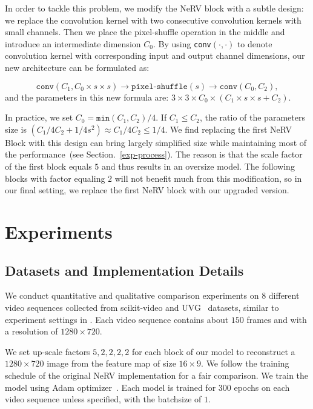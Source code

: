 \documentclass[runningheads]{llncs}
\begin{document}
In order to tackle this problem, we modify the NeRV block with a subtle design: we replace the convolution kernel with two consecutive convolution kernels with small channels. Then we place the pixel-shuffle operation in the middle and introduce an intermediate dimension $C_0$. By using \texttt{conv}$\left(\cdot,\cdot\right)$ to denote convolution kernel with corresponding input and output channel dimensions, our new architecture can be formulated as:

\begin{equation}
\texttt{conv}(C_1, C_0\times s\times s)\rightarrow\texttt{pixel-shuffle}(s)\rightarrow\texttt{conv}(C_0, C_2),
\end{equation}
and the parameters in this new formula are: $3\times 3\times C_0 \times(C_1 \times s\times s + C_2)$.

In practice, we set $C_0 = \texttt{min}(C_1, C_2) / 4$. If $C_1 \leq C_2$, the ratio of the parameters size is $(C_1 / 4C_2 + 1 / 4s^2)\approx C_1 / 4C_2 \leq 1/4$. We find replacing the first NeRV Block with this design can bring largely simplified size while maintaining most of the performance~(see Section.~\ref{exp-process}). The reason is that the scale factor of the first block equals $5$ and thus results in an oversize model. The following blocks with factor equaling $2$ will not benefit much from this modification, so in our final setting, we replace the first NeRV block with our upgraded version. 

 \section{Experiments}
\label{experiments}

\subsection{Datasets and Implementation Details}
\label{datasets and implementation}

We conduct quantitative and qualitative comparison experiments on $8$ different video sequences collected from scikit-video and UVG~\cite{mercat2020uvg} datasets, similar to experiment settings in \cite{chen2021nerv}. Each video sequence contains about $150$ frames and with a resolution of $1280\times 720$.

We set up-scale factors $5, 2, 2, 2, 2$ for each block of our model to reconstruct a $1280\times 720$ image from the feature map of size $16\times 9$. We follow the training schedule of the original NeRV implementation for a fair comparison. We train the model using Adam optimizer~\cite{kingma2014adam}. Each model is trained for $300$ epochs on each video sequence unless specified, with the batchsize of $1$. 
\end{document}
